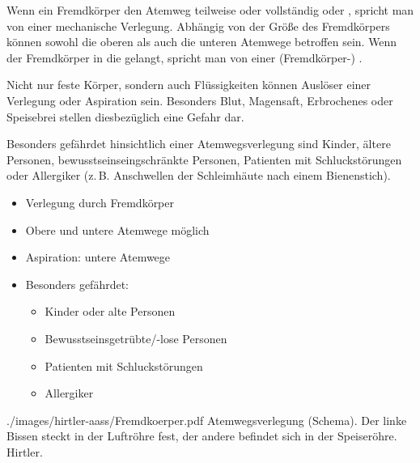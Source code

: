 

{%
%
Wenn ein Fremdkörper den Atemweg teilweise oder vollständig 
 oder , spricht man von einer
mechanische Verlegung. Abhängig von der Größe des
Fremdkörpers können sowohl die oberen als auch die unteren
Atemwege betroffen sein. Wenn der Fremdkörper in die
 gelangt, spricht man von einer
(Fremdkörper-) .

Nicht nur feste Körper, sondern auch Flüssigkeiten können
Auslöser einer Verlegung oder Aspiration sein. Besonders
Blut, Magensaft, Erbrochenes oder Speisebrei stellen
diesbezüglich eine Gefahr dar.

Besonders gefährdet hinsichtlich einer Atemwegsverlegung sind
Kinder, ältere Personen, bewusstseinseingschränkte Personen,
Patienten mit Schluckstörungen oder Allergiker (z.\,B.
Anschwellen der Schleimhäute nach einem Bienenstich).
}
{%
\begin{itemize}
  \item Verlegung durch Fremdkörper
  \item Obere und untere Atemwege möglich
  \item Aspiration: untere Atemwege
  \item Besonders gefährdet:
  \begin{itemize}
    \item Kinder oder alte Personen
    \item Bewusstseinsgetrübte/-lose Personen
    \item Patienten mit Schluckstörungen
    \item Allergiker
  \end{itemize}
\end{itemize}
}
{./images/hirtler-aass/Fremdkoerper.pdf}
{Atemwegsverlegung (Schema). Der linke Bissen steckt in der Luftröhre fest, der
andere befindet sich in der Speiseröhre.}
{Hirtler.}


